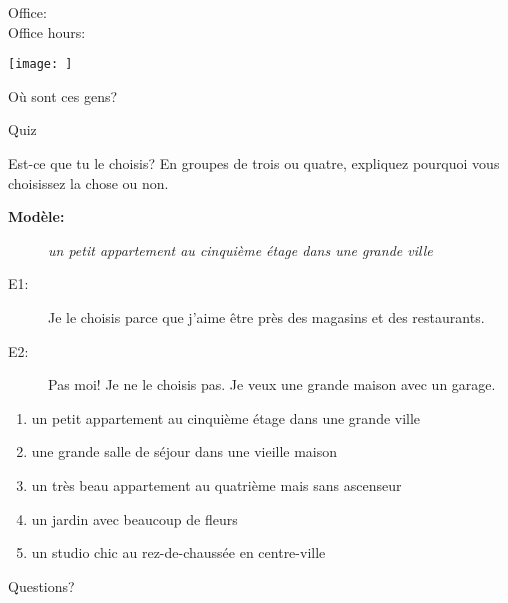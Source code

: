 \documentclass{beamer}
\subtitle[Étages et objets directs]{Les étages et les pronoms compléments d'objet direct}
\begin{document}
  \begin{frame}
    \titlepage
    \tiny{Office: \\
          Office hours: }
  \end{frame}

  \begin{frame}{}
    \begin{center}
      \texttt{[image: ]}
    \end{center}
    Où sont ces gens? \\
  \end{frame}

  \begin{frame}{}
    \begin{center}
      \Large Quiz
    \end{center}
  \end{frame}

  \begin{frame}{Est-ce que tu le choisis?}
    En groupes de trois ou quatre, expliquez pourquoi vous choisissez la chose ou non.
    \begin{description}
      \item[\textbf{Modèle:}] \emph{un petit appartement au cinquième étage dans une grande ville}
      \item[E1:] Je le choisis parce que j'aime être près des magasins et des restaurants.
      \item[E2:] Pas moi! Je ne le choisis pas. Je veux une grande maison avec un garage.
    \end{description}
    \begin{enumerate}
      \item un petit appartement au cinquième étage dans une grande ville
      \item une grande salle de séjour dans une vieille maison
      \item un très beau appartement au quatrième mais sans ascenseur
      \item un jardin avec beaucoup de fleurs
      \item un studio chic au rez-de-chaussée en centre-ville
    \end{enumerate}
  \end{frame}

  \begin{frame}{}
    \begin{center}
      \Large Questions?
    \end{center}
  \end{frame}
\end{document}
